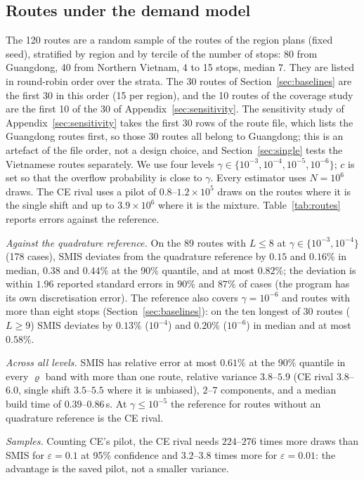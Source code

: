 \documentclass[ijoc,sglanonrev]{informs4}
\begin{document}
\subsection{Routes under the demand model}
\label{sec:routes}
The 120 routes are a random sample of the routes of the region plans (fixed
seed), stratified by region and by tercile of the number of stops: 80 from
Guangdong, 40 from Northern Vietnam, 4 to 15 stops, median 7. They are listed in
round-robin order over the strata. The 30 routes of Section~\ref{sec:baselines}
are the first 30 in this order (15 per region), and the 10 routes of the
coverage study are the first 10 of the 30 of Appendix~\ref{sec:sensitivity}.
The sensitivity study of Appendix~\ref{sec:sensitivity} takes the first 30 rows
of the route file, which lists the Guangdong routes first, so those 30 routes
all belong to Guangdong; this is an artefact of the file order, not a design
choice, and Section~\ref{sec:single} tests the Vietnamese routes separately.
We use four levels $\gamma\in\{10^{-3},10^{-4},10^{-5},10^{-6}\}$; $c$ is set so
that the overflow probability is close to $\gamma$. Every estimator uses
$N=10^6$ draws. The CE rival uses a pilot of $0.8$--$1.2\times10^5$ draws on
the routes where it is the single shift and up to $3.9\times10^6$ where it is the
mixture. Table~\ref{tab:routes} reports errors against the reference.

\emph{Against the quadrature reference.} On the 89 routes with $L\le8$ at
$\gamma\in\{10^{-3},10^{-4}\}$ (178 cases), SMIS deviates from the quadrature
reference by $0.15$ and $0.16\%$ in median, $0.38$ and $0.44\%$ at the
90\% quantile, and at most $0.82\%$; the deviation is within $1.96$ reported
standard errors in $90\%$ and $87\%$ of cases (the program has its own
discretisation error). The reference also covers $\gamma=10^{-6}$ and
routes with more than eight stops (Section~\ref{sec:baselines}): on the ten
longest of 30 routes ($L\ge9$) SMIS deviates by $0.13\%$ ($10^{-4}$) and
$0.20\%$ ($10^{-6}$) in median and at most $0.58\%$.

\emph{Across all levels.} SMIS has relative error at most $0.61\%$ at the
90\% quantile in every $\varrho$ band with more than one route, relative
variance $3.8$--$5.9$ (CE rival $3.8$--$6.0$, single shift $3.5$--$5.5$
where it is unbiased), $2$--$7$ components, and a median build time of
$0.39$--$0.86$\,s. At $\gamma\le10^{-5}$ the reference for routes without an
quadrature reference is the CE rival.

\emph{Samples.} Counting CE's pilot, the CE rival needs $224$--$276$ times
more draws than SMIS for $\varepsilon=0.1$ at 95\% confidence and $3.2$--$3.8$
times more for $\varepsilon=0.01$: the advantage is the saved pilot, not a
smaller variance.
\end{document}
